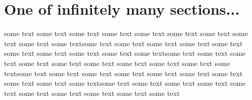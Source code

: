 \section{One of infinitely many sections...}
\label{sec:one-of-many}

some text some text some text some text some text some text some text
some text some text some textsome text some text some text some text
some text some text some text some text some text some textsome text
some text some text some text some text some text some text some text
some text some textsome text some text some text some text some text
some text some text some text some text some textsome text some text
some text some text some text some text some text some text some text
some text

